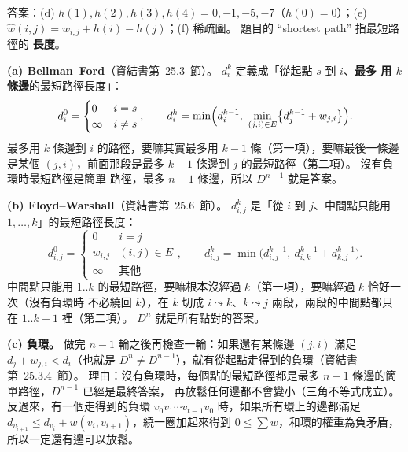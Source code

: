 \begin{pastsoln}
答案：(d) $h(1), h(2), h(3), h(4) = 0, -1, -5, -7$（$h(0) = 0$）；(e)
$\widehat{w}(i, j) = w_{i,j} + h(i) - h(j)$；(f) 稀疏圖。 題目的 ``shortest path'' 指最短路徑的
\textbf{長度}。

\textbf{(a) Bellman--Ford}（資結書第~25.3~節）。 $d_i^k$ 定義成「從起點 $s$ 到 $i$、\textbf{最多
用 $k$ 條邊}的最短路徑長度」：
\[
d_i^0 = \begin{cases} 0 & i = s \\ \infty & i \ne s \end{cases}, \qquad
d_i^k = \min\Bigl( d_i^{k-1},\ \min_{(j, i) \in E} \bigl\{ d_j^{k-1} + w_{j,i} \bigr\} \Bigr).
\]
最多用 $k$ 條邊到 $i$ 的路徑，要嘛其實最多用 $k - 1$ 條（第一項），要嘛最後一條邊是某個
$(j, i)$，前面那段是最多 $k - 1$ 條邊到 $j$ 的最短路徑（第二項）。 沒有負環時最短路徑是簡單
路徑，最多 $n - 1$ 條邊，所以 $D^{n-1}$ 就是答案。

\textbf{(b) Floyd--Warshall}（資結書第~25.6~節）。 $d_{i,j}^k$ 是「從 $i$ 到 $j$、中間點只能用
$1, \ldots, k$」的最短路徑長度：
\[
d_{i,j}^0 = \begin{cases} 0 & i = j \\ w_{i,j} & (i, j) \in E \\ \infty & \text{其他} \end{cases},
\qquad
d_{i,j}^k = \min\bigl( d_{i,j}^{k-1},\ d_{i,k}^{k-1} + d_{k,j}^{k-1} \bigr).
\]
中間點只能用 $1..k$ 的最短路徑，要嘛根本沒經過 $k$（第一項），要嘛經過 $k$ 恰好一次（沒有負環時
不必繞回 $k$），在 $k$ 切成 $i \leadsto k$、$k \leadsto j$ 兩段，兩段的中間點都只在
$1..k-1$ 裡（第二項）。 $D^n$ 就是所有點對的答案。

\textbf{(c) 負環。} 做完 $n - 1$ 輪之後再檢查一輪：如果還有某條邊 $(j, i)$ 滿足
$d_j + w_{j,i} < d_i$（也就是 $D^n \ne D^{n-1}$），就有從起點走得到的負環（資結書第~25.3.4~節）。
理由：沒有負環時，每個點的最短路徑都是最多 $n - 1$ 條邊的簡單路徑，$D^{n-1}$ 已經是最終答案，
再放鬆任何邊都不會變小（三角不等式成立）。 反過來，有一個走得到的負環 $v_0 v_1 \cdots v_{t-1}
v_0$ 時，如果所有環上的邊都滿足 $d_{v_{i+1}} \le d_{v_i} + w(v_i, v_{i+1})$，繞一圈加起來得到
$0 \le \sum w$，和環的權重為負矛盾，所以一定還有邊可以放鬆。


\end{pastsoln}
